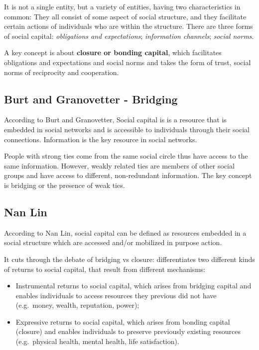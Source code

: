 \documentclass[
  notitlepage,
  onecolumn,
  openany]{book}
\providecommand{\tightlist}{%
  \setlength{\itemsep}{0pt}\setlength{\parskip}{0pt}}
\begin{document}
It is not a single entity, but a variety of entities, having two characteristics in common: They all consist of some aspect of social structure, and they facilitate certain actions of individuals who are within the structure. There are three forms of social capital: \emph{obligations and expectations}; \emph{information channels}; \emph{social norms}.

A key concept is about \textbf{closure or bonding capital}, which facilitates obligations and expectations and social norms and takes the form of trust, social norms of reciprocity and cooperation.

\hypertarget{burt-and-granovetter---bridging}{%
\subsection{Burt and Granovetter - Bridging}\label{burt-and-granovetter---bridging}}

According to Burt and Granovetter, Social capital is is a resource that is embedded in social networks and is accessible to individuals through their social connections. Information is the key resource in social networks.

People with strong ties come from the same social circle thus have access to the same information. However, weakly related ties are members of other social groups and have access to different, non-redundant information. The key concept is bridging or the presence of weak ties.

\hypertarget{nan-lin}{%
\subsection{Nan Lin}\label{nan-lin}}

According to Nan Lin, social capital can be defined as resources embedded in a social structure which are accessed and/or mobilized in purpose action.

It cuts through the debate of bridging vs closure: differentiates two different kinds of returns to social capital, that result from different mechanisms:

\begin{itemize}
\tightlist
\item
  Instrumental returns to social capital, which arises from bridging capital and enables individuals to access resources they previous did not have (e.g.~money, wealth, reputation, power);
\item
  Expressive returns to social capital, which arises from bonding capital (closure) and enables individuals to preserve previously existing resources (e.g.~physical health, mental health, life satisfaction).
\end{itemize}
\end{document}
